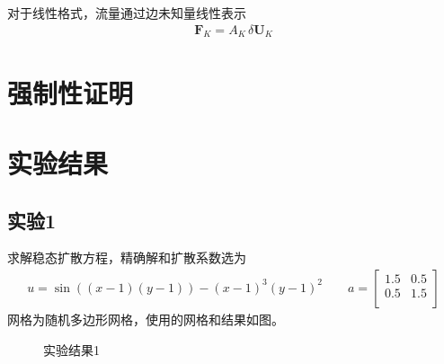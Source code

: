 \documentclass[12pt,a4paper]{article}
\theoremstyle{plain}
\begin{document}
对于线性格式，流量通过边未知量线性表示
\begin{align*}
\mathbf{F}_K = A_K \, \delta \mathbf{U}_K
\end{align*}



\section*{强制性证明}
















\section*{实验结果}

\subsection*{实验1}

求解稳态扩散方程，精确解和扩散系数选为
\begin{align*}
u = \sin((x-1)(y-1)) - (x-1)^3 (y-1)^2 \qquad
a = \left[
\begin{matrix}
1.5 & 0.5 \\
0.5 & 1.5 \\
\end{matrix}
\right]
\end{align*}
网格为随机多边形网格，使用的网格和结果如图。

\begin{figure}[H]
\centering
{}
\caption{实验结果1}
\end{figure}
\end{document}
